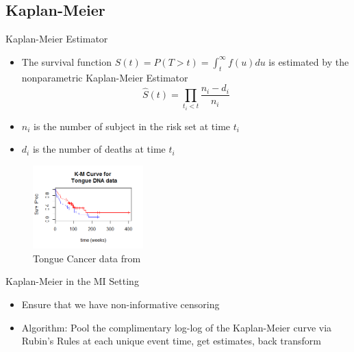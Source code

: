 \subsection{Kaplan-Meier}
\begin{frame}{Kaplan-Meier Estimator}
\begin{itemize}
 \item The survival function $S(t)=P(T>t)=\int_{t}^{\infty}f(u)du$ is estimated by the 
 nonparametric Kaplan-Meier Estimator
 $$\hat{S}(t)=\prod_{t_i<t}\frac{n_i -d_i}{n_i}$$
\item $n_i$ is the number of subject in the risk set at time $t_i$
\item $d_i$ is the number of deaths at time $t_i$
\end{itemize}
 \begin{figure}[h!]
  \centering
    \includegraphics[width=0.38\textwidth]{km_example.png}
  \caption{Tongue Cancer data from \cite{Klein1984}}
\label{fig:KMcurve}
\end{figure}
\end{frame}




\begin{frame}{Kaplan-Meier in the MI Setting}
 \begin{itemize}
  \item Ensure that we have non-informative censoring
\item Algorithm: Pool the complimentary log-log of the Kaplan-Meier curve via Rubin's Rules at
each unique event time, get estimates,
back transform \cite{Marshall2009}
 \end{itemize}
\end{frame}


